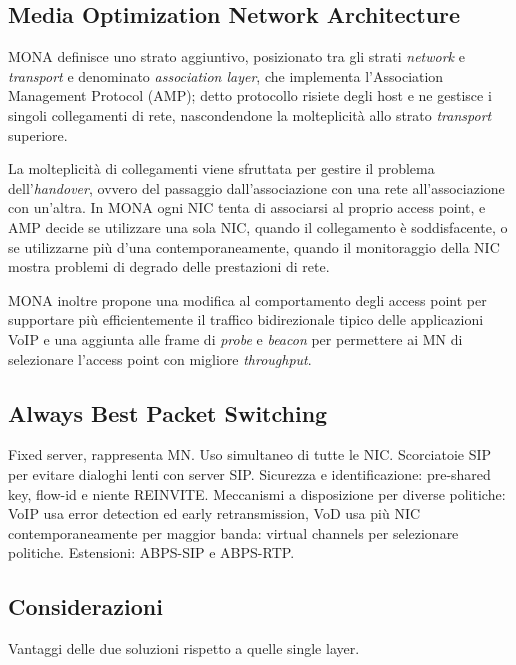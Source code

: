\documentclass[12pt,a4paper,openright,twoside]{book}
\begin{document}
\subsection{Media Optimization Network Architecture}

MONA definisce uno strato aggiuntivo, posizionato tra gli strati
\emph{network} e \emph{transport} e denominato \emph{association
  layer}, che implementa l'Association Management Protocol (AMP);
detto protocollo risiete degli host e ne gestisce i singoli
collegamenti di rete, nascondendone la molteplicità allo strato
\emph{transport} superiore.

La molteplicità di collegamenti viene sfruttata per gestire il
problema dell'\emph{handover}, ovvero del passaggio dall'associazione
con una rete all'associazione con un'altra. In MONA ogni NIC tenta di
associarsi al proprio access point, e AMP decide se utilizzare una
sola NIC, quando il collegamento è soddisfacente, o se utilizzarne più
d'una contemporaneamente, quando il monitoraggio della NIC mostra
problemi di degrado delle prestazioni di rete.

MONA inoltre propone una modifica al comportamento degli access point
per supportare più efficientemente il traffico bidirezionale tipico
delle applicazioni VoIP e una aggiunta alle frame di \emph{probe} e
\emph{beacon} per permettere ai MN di selezionare l'access point con
migliore \emph{throughput}.


\subsection{Always Best Packet Switching}

Fixed server, rappresenta MN. Uso simultaneo di tutte le
NIC. Scorciatoie SIP per evitare dialoghi lenti con server
SIP. Sicurezza e identificazione: pre-shared key, flow-id e niente
REINVITE. Meccanismi a disposizione per diverse politiche: VoIP usa
error detection ed early retransmission, VoD usa più NIC
contemporaneamente per maggior banda: virtual channels per selezionare
politiche. Estensioni: ABPS-SIP e ABPS-RTP.


\subsection{Considerazioni}
Vantaggi delle due soluzioni rispetto a quelle single layer.

\clearpage{\pagestyle{empty}\cleardoublepage}
\end{document}
